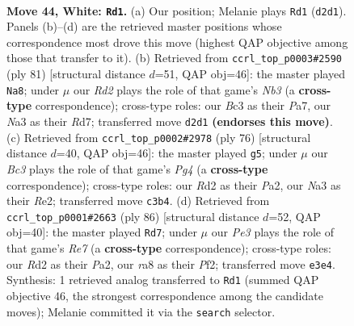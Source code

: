 \documentclass[11pt]{article}
\begin{document}
\clearpage

\begin{figure}[p]\centering
\begin{subfigure}{0.46\textwidth}\centering
\resizebox{\linewidth}{!}{%
\newchessgame
\chessboard[
  setfen={r1r5/pn6/1p2p1kp/5p2/2P4R/N1B1P3/P2R1PP1/5K2 w - - 2 44},
  showmover=false,
  pgfstyle=straightmove, color=movearrow, markmove={d2-d1}
]}
\caption{}
\end{subfigure}\hfill
\begin{subfigure}{0.46\textwidth}\centering
\resizebox{\linewidth}{!}{%
\newchessgame
\chessboard[
  setfen={8/p2r2p1/1n3k1p/1P3p2/1B1p4/PP4P1/2r2P2/3RR1K1 b - - 0 41},
  showmover=false,
  pgfstyle=straightmove, color=movearrow, markmove={b6-a8}
]}
\caption{}
\end{subfigure}
\\[4pt]
\begin{subfigure}{0.46\textwidth}\centering
\resizebox{\linewidth}{!}{%
\newchessgame
\chessboard[
  setfen={2r1r1k1/p4pp1/1p1p4/3R4/4PBPp/b1P5/P3RPP1/6K1 w - - 1 39},
  showmover=false,
  pgfstyle=straightmove, color=movearrow, markmove={g4-g5}
]}
\caption{}
\end{subfigure}\hfill
\begin{subfigure}{0.46\textwidth}\centering
\resizebox{\linewidth}{!}{%
\newchessgame
\chessboard[
  setfen={5rk1/4Rp2/7p/3p2pP/p1rP4/5RP1/P4PK1/8 w - - 2 44},
  showmover=false,
  pgfstyle=straightmove, color=movearrow, markmove={e7-d7}
]}
\caption{}
\end{subfigure}
\caption{\textbf{Move 44, White: \texttt{Rd1}.} (a) Our position; Melanie plays \texttt{Rd1} (\texttt{d2d1}). Panels (b)--(d) are the retrieved master positions whose correspondence most drove this move (highest QAP objective among those that transfer to it). (b) Retrieved from \texttt{ccrl\_top\_p0003\#2590} (ply 81) [structural distance $d$=51, QAP obj=46]: the master played \texttt{Na8}; under $\mu$ our \emph{Rd2} plays the role of that game's \emph{Nb3} (a \textbf{cross-type} correspondence); cross-type roles: our \emph{B}c3 as their \emph{P}a7, our \emph{N}a3 as their \emph{R}d7; transferred move \texttt{d2d1} \textbf{(endorses this move)}. (c) Retrieved from \texttt{ccrl\_top\_p0002\#2978} (ply 76) [structural distance $d$=40, QAP obj=46]: the master played \texttt{g5}; under $\mu$ our \emph{Bc3} plays the role of that game's \emph{Pg4} (a \textbf{cross-type} correspondence); cross-type roles: our \emph{R}d2 as their \emph{P}a2, our \emph{N}a3 as their \emph{R}e2; transferred move \texttt{c3b4}. (d) Retrieved from \texttt{ccrl\_top\_p0001\#2663} (ply 86) [structural distance $d$=52, QAP obj=40]: the master played \texttt{Rd7}; under $\mu$ our \emph{Pe3} plays the role of that game's \emph{Re7} (a \textbf{cross-type} correspondence); cross-type roles: our \emph{R}d2 as their \emph{P}a2, our \emph{r}a8 as their \emph{P}f2; transferred move \texttt{e3e4}. Synthesis: 1 retrieved analog transferred to \texttt{Rd1} (summed QAP objective 46, the strongest correspondence among the candidate moves); Melanie committed it via the \texttt{search} selector.}
\label{fig:thought-m86}
\end{figure}
\end{document}

